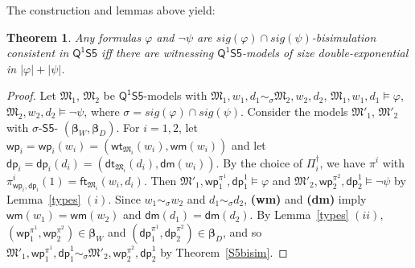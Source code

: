 \documentclass[10pt,a4paper]{amsart}
\theoremstyle{plain}
\newtheorem{thm}{Theorem}[section]
\theoremstyle{definition}
\newcommand{\sig}{\mathit{sig}}
\newcommand{\FOMS}{\ensuremath{\mathsf{Q^1S5}}}
\newcommand{\BS}{$\mathsf{S5}$-\text{bisimulation}}
\newcommand{\wt}{\mathsf{wt}}
\newcommand{\dt}{\mathsf{dt}}
\newcommand{\ft}{\mathsf{ft}}
\newcommand{\wm}{\mathsf{wm}}
\newcommand{\dm}{\mathsf{dm}}
\newcommand{\iwp}{\mathsf{wp}_i}
\newcommand{\idp}{\mathsf{dp}_i}
\newcommand{\owp}{\mathsf{wp}_1}
\newcommand{\twp}{\mathsf{wp}_2}
\newcommand{\odp}{\mathsf{dp}_1}
\newcommand{\tdp}{\mathsf{dp}_2}
\newcommand{\bs}{\boldsymbol{\beta}}
\newcommand{\fform}[1]{\boldsymbol{#1}}
\newcommand{\pvar}{\fform{p}}
\begin{document}
%
%

The construction and lemmas above yield:

\begin{thm}\label{th:sizebound}
Any formulas $\varphi$ and $\neg\psi$ are $\sig(\varphi) \cap \sig(\psi)$-bisimulation consistent in $\FOMS$ iff there are witnessing $\FOMS$-models of size double-exponential in $|\varphi|+|\psi|$.
\end{thm}
%
\begin{proof}
	Let $\mathfrak M_1$, $\mathfrak M_2$ be 
	$\FOMS$-models with	
	$\mathfrak{M}_{1},w_{1},d_{1} \sim_{\sigma} \mathfrak{M}_{2},w_{2},d_{2}$, $\mathfrak{M}_{1},w_{1}, d_1 \models \varphi$, $\mathfrak{M}_{2},w_{2}, d_2 \models\neg \psi$, where $\sigma = \sig(\varphi) \cap \sig(\psi)$.  Consider the models $\mathfrak{M}'_{1}$, $\mathfrak{M}'_{2}$ with 
$\sigma$-\BS{} $(\bs_W,\bs_D)$. For $i=1,2$, let $\iwp =\iwp(w_i) = (\wt_{\mathfrak M_i}(w_i), \wm(w_i))$ and let $\idp =\idp(d_i) = (\dt_{\mathfrak M_i}(d_i), \dm(w_i))$. By the choice of $\Pi_{i}^{\dag}$, we have $\pi^i$ with $\pi^i_{\iwp,\idp}(1) = \ft_{\mathfrak M_i}(w_i,d_i)$. Then $\mathfrak M'_1, \owp^{\pi^1}, \odp^1 \models \varphi$ and $\mathfrak M'_2, \twp^{\pi^2}, \tdp^1 \models\neg \psi$ by Lemma~\ref{types} $(i)$. Since $w_1 \sim_\sigma w_2$ and $d_1 \sim_\sigma d_2$, {\bf (wm)} and {\bf (dm)} imply $\wm(w_1) = \wm(w_2)$ and $\dm(d_1) = \dm(d_2)$. By Lemma~\ref{types} $(ii)$, $(\owp^{\pi^1},\twp^{\pi^2}) \in \bs_W$ and $ (\odp^{\pi^1},\tdp^{\pi^2}) \in \bs_D$, and so $\mathfrak M'_1, \owp^{\pi^1}, \odp^1 \sim_\sigma \mathfrak M'_2, \twp^{\pi^2}, \tdp^1$ by Theorem~\ref{S5bisim}.
\end{proof}
\end{document}
